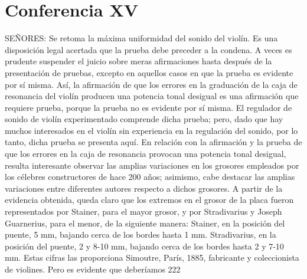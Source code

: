 \chapter*{Conferencia XV}
SEÑORES: Se retoma la máxima uniformidad del sonido del violín. Es una disposición legal acertada que la prueba debe preceder a la condena. A veces es prudente suspender el juicio sobre meras afirmaciones hasta después de la presentación de pruebas, excepto en aquellos casos en que la prueba es evidente por sí misma. Así, la afirmación de que los errores en la graduación de la caja de resonancia del violín producen una potencia tonal desigual es una afirmación que requiere prueba, porque la prueba no es evidente por sí misma. El regulador de sonido de violín experimentado comprende dicha prueba; pero, dado que hay muchos interesados en el violín sin experiencia en la regulación del sonido, por lo tanto, dicha prueba se presenta aquí.
En relación con la afirmación y la prueba de que los errores en la caja de resonancia provocan una potencia tonal desigual, resulta interesante observar las amplias variaciones en los grosores empleados por los célebres constructores de hace 200 años; asimismo, cabe destacar las amplias variaciones entre diferentes autores respecto a dichos grosores. A partir de la evidencia obtenida, queda claro que los extremos en el grosor de la placa fueron representados por Stainer, para el mayor grosor, y por Stradivarius y Joseph Guarnerius, para el menor, de la siguiente manera:
Stainer, en la posición del puente, 5 mm, bajando cerca de los bordes hasta 1 mm. Stradivarius, en la posición del puente, 2 y 8-10 mm, bajando cerca de los bordes hasta 2 y 7-10 mm. Estas cifras las proporciona Simoutre, París, 1885, fabricante y coleccionista de violines. Pero es evidente que deberíamos
222

